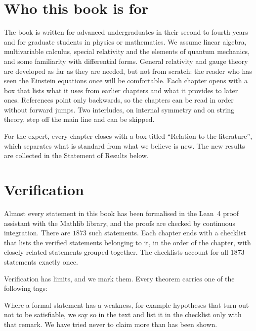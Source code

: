 \section*{Who this book is for}

The book is written for advanced undergraduates in their second to fourth years and for graduate students in physics or mathematics. We assume linear algebra, multivariable calculus, special relativity and the elements of quantum mechanics, and some familiarity with differential forms. General relativity and gauge theory are developed as far as they are needed, but not from scratch: the reader who has seen the Einstein equations once will be comfortable. Each chapter opens with a box that lists what it uses from earlier chapters and what it provides to later ones. References point only backwards, so the chapters can be read in order without forward jumps. Two interludes, on internal symmetry and on string theory, step off the main line and can be skipped.

For the expert, every chapter closes with a box titled ``Relation to the literature'', which separates what is standard from what we believe is new. The new results are collected in the Statement of Results below.

\section*{Verification}

Almost every statement in this book has been formalised in the Lean~4 proof assistant with the Mathlib library, and the proofs are checked by continuous integration. There are $1873$ such statements. Each chapter ends with a checklist that lists the verified statements belonging to it, in the order of the chapter, with closely related statements grouped together. The checklists account for all $1873$ statements exactly once.

Verification has limits, and we mark them. Every theorem carries one of the following tags:
Where a formal statement has a weakness, for example hypotheses that turn out not to be satisfiable, we say so in the text and list it in the checklist only with that remark. We have tried never to claim more than has been shown.

